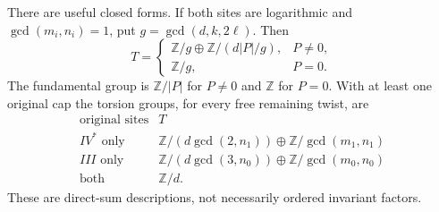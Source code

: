 There are useful closed forms. If both sites are
logarithmic and $\gcd(m_i,n_i)=1$, put
$g=\gcd(d,k,2\ell)$. Then
\[
 T=
 \begin{cases}
 \mathbb Z/g\oplus\mathbb Z/(d|P|/g),&P\ne0,\\
 \mathbb Z/g,&P=0.
 \end{cases}                                               \tag{D.WE7}
\]
The fundamental group is $\mathbb Z/|P|$ for $P\ne0$
and $\mathbb Z$ for $P=0$. With at least one original
cap the torsion groups, for every free remaining twist,
are
\[
\begin{array}{c|c}
\text{original sites}&T\\\hline
IV^*\text{ only}&
 \mathbb Z/(d\gcd(2,n_1))\oplus\mathbb Z/\gcd(m_1,n_1)\\
III\text{ only}&
 \mathbb Z/(d\gcd(3,n_0))\oplus\mathbb Z/\gcd(m_0,n_0)\\
\text{both}&\mathbb Z/d .
\end{array}                                                \tag{D.WE8}
\]
These are direct-sum descriptions, not necessarily
ordered invariant factors.

